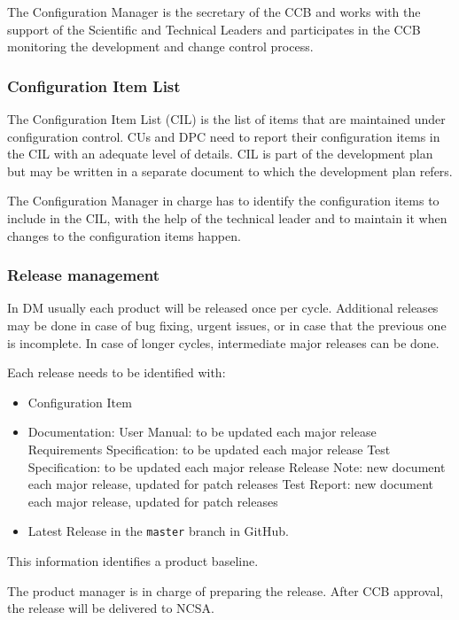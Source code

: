 The Configuration Manager is the secretary of the CCB and works with the support of the Scientific and Technical Leaders and participates in the CCB monitoring the development and change control process.

\subsubsection{Configuration Item List}

The Configuration Item List (CIL) is the list of items that are maintained under configuration control.
CUs and DPC need to report their configuration items in the CIL with an adequate level of details.
CIL is part of the development plan but may be written in a separate document to which the development plan refers.

The Configuration Manager in charge has to identify the configuration items to include in the CIL, with the help of the technical leader and to maintain it when changes to the configuration items happen.


\subsubsection{Release management\label{sect:relMng}}

In DM usually each product will be released once per cycle.
Additional releases may be done in case of bug fixing, urgent issues, or in case that the previous one is incomplete.
In case of longer cycles, intermediate major releases can be done.

Each release needs to be identified with:

\begin{itemize}
\item Configuration Item
\item Documentation:
\subitem User Manual: to be updated each major release
\subitem Requirements Specification: to be updated each major release
\subitem Test Specification: to be updated each major release
\subitem Release Note: new document each major release, updated for patch releases
\subitem Test Report: new document each major release, updated for patch releases
\item Latest Release in the \texttt{master} branch in GitHub.
\end{itemize}
This information identifies a product baseline.

The product manager is in charge of preparing the release.
After CCB approval, the release will be delivered to NCSA.

